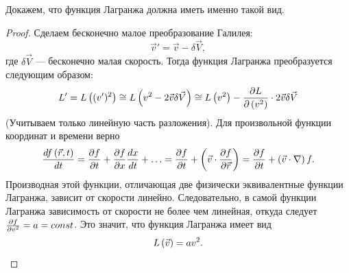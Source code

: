     Докажем, что функция Лагранжа должна иметь именно такой вид.
    \begin{proof}
        Сделаем бесконечно малое преобразование Галилея:
        \[
            \vec{v}' = \vec{v} - \delta\vec{V}, 
        \]
        где $\delta\vec{V}$ --- бесконечно малая скорость. Тогда функция Лагранжа преобразуется следующим образом:
        \[
            L' = L\left({(v')^2}\right) \cong L\left({v^2 - 2 \vec{v}\delta\vec{V}}\right)
            \cong L\left({v^2}\right) - \frac{\partial L}{\partial\left({v^2}\right)}\cdot 2\vec{v}\delta{\vec{V}}
        \]
        (Учитываем только линейную часть разложения).
        Для произвольной функции координат и времени верно
        \[
            \frac{df\left({\vec{r}, t}\right)}{dt} = \frac{\partial f}{\partial t} + \frac{\partial f}{\partial x}\frac{dx}{dt} + \ldots = \frac{\partial f}{\partial t} + \left({\vec{v}\cdot\frac{\partial f}{\partial\vec{r}}}\right)
            = \frac{\partial f}{\partial t} + \left({\vec{v}\cdot\nabla}\right)f.
        \]
        Производная этой функции, отличающая две физически эквивалентные функции Лагранжа, зависит от скорости линейно. Следовательно, в самой
        функции Лагранжа зависимость от скорости не более чем линейная, откуда следует $\frac{\partial f}{\partial v^2} = a = const$.
        Это значит, что функция Лагранжа имеет вид
        \[
            L\left({\vec{v}}\right) = av^2.
        \]
    \end{proof}

